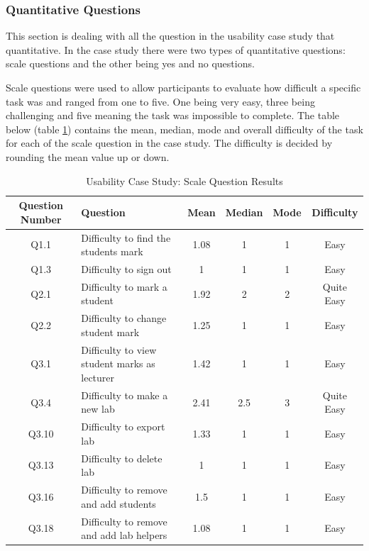 \documentclass[12pt]{article}  %
\begin{document}
\subsubsection{Quantitative Questions}

This section is dealing with all the question in the usability case study that quantitative. In the case study there were two types of quantitative questions: scale questions and the other being  yes and no questions.

Scale questions were used to allow participants to evaluate how difficult a specific task was and ranged from one to five. One being very easy, three being challenging and five meaning the task was impossible to complete. 
The table below (table \ref{table:usability}) contains the mean, median, mode and overall difficulty of the task for each of the scale question in the case study. The difficulty is decided by rounding the mean value up or down.

\setlength\LTleft{0pt}
\setlength\LTright{0pt}


\begin{longtable}{@{\extracolsep{\fill}}|c|l|c|c|c|c|}
\caption{Usability Case Study: Scale Question Results} \label{table:usability} \\ \hline

\textbf{Question Number} & \textbf{Question} & \textbf{Mean} & \textbf{Median} & \textbf{Mode} & \textbf{Difficulty}\\ \hline

Q1.1 & Difficulty to find the students mark & 1.08 & 1 & 1 & Easy\\ \hline
Q1.3 & Difficulty to sign out & 1 & 1 & 1 & Easy \\ \hline

Q2.1 & Difficulty to mark a student & 1.92 & 2 & 2 & Quite Easy \\ \hline
Q2.2 & Difficulty to change student mark & 1.25 & 1 & 1 &  Easy \\ \hline

Q3.1 & Difficulty to view student marks as lecturer & 1.42 & 1 & 1 &  Easy \\ \hline
Q3.4 & Difficulty to make a new lab & 2.41 & 2.5 & 3 & Quite Easy \\ \hline
Q3.10 & Difficulty to export lab & 1.33 & 1 & 1 &  Easy \\ \hline
Q3.13 & Difficulty to delete lab & 1 & 1 & 1 &  Easy \\ \hline
Q3.16 & Difficulty to remove and add students & 1.5 & 1 & 1 &  Easy \\ \hline
Q3.18 & Difficulty to remove and add lab helpers & 1.08 & 1 & 1 & Easy \\ \hline

\end{longtable}
\end{document}
